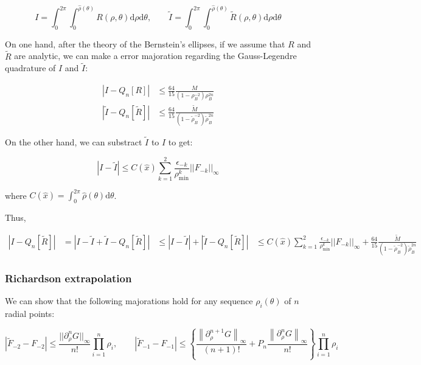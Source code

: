 ﻿\documentclass{article}
\begin{document}
\begin{equation}
  I = \int_{0}^{2\pi}\int_{0}^{\hat\rho(\theta)}R(\rho, \theta)\mathrm d\rho\mathrm d\theta, \qquad \widetilde I = \int_{0}^{2\pi}\int_{0}^{\hat\rho(\theta)}\widetilde R(\rho, \theta)\mathrm d\rho\mathrm d\theta
\end{equation}

On one hand, after the theory of the Bernstein's ellipses, if we assume that $R$ and $\widetilde R$ are analytic, we can make a error majoration regarding the Gauss-Legendre quadrature of $I$ and $\widetilde I$:

\begin{align}
  \left|I - Q_n[R]\right| & \leq \frac{64}{15}\frac{M}{(1 - \rho_B^{-2})\rho_B^{2n}} \\
  \left|\widetilde I - Q_n[\widetilde R]\right| & \leq \frac{64}{15}\frac{\widetilde M}{(1 - \widetilde \rho_B^{-2})\widetilde \rho_B^{2n}}
\end{align}

On the other hand, we can substract $\widetilde I$ to $I$ to get:

\begin{equation}
  |I - \widetilde I| \leq C(\hat x) \sum_{k=1}^2\frac{\epsilon_{-k}}{\rho_{\min}^k}||F_{-k}||_{\infty}
\end{equation}

where $\displaystyle{C(\hat x) = \int_{0}^{2\pi}\hat\rho(\theta)\mathrm d\theta}$.

Thus, 

\begin{align}
  |I - Q_n[\widetilde R]| & = |I - \widetilde I + \widetilde I - Q_n[\widetilde R]| & \leq |I - \widetilde I| + |\widetilde I - Q_n[\widetilde R]| & \leq C(\hat x) \sum_{k=1}^2\frac{\epsilon_{-k}}{\rho_{\min}^k}||F_{-k}||_{\infty} + \frac{64}{15}\frac{\widetilde M}{(1 - \widetilde \rho_B^{-2})\widetilde \rho_B^{2n}}
\end{align}

\subsubsection{Richardson extrapolation}

\begin{lemma}\label{lemma:convergence_Richardson}
  
  We can show that the following majorations hold for any sequence $\rho_i(\theta)$ of $n$ radial points:

  \begin{equation}
    |\widetilde F_{-2} - F_{-2}| \leq \frac{||\partial^n_\rho G||_{\infty}}{n!}\prod_{i=1}^{n}\rho_i, \qquad |\widetilde F_{-1} - F_{-1}| \leq \left\{\frac{\left\|\partial_\rho^{n+1}G\right\|_{\infty}}{(n+1)!}+P_n\frac{\left\|\partial_\rho^{n}G\right\|_{\infty}}{n!}\right\}\prod_{i=1}^{n}\rho_i
  \end{equation}

\end{lemma}
\end{document}
